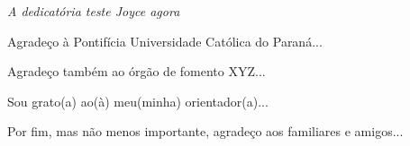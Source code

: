 

\imprimircapa

\imprimirfolhaderosto



\begin{fichacatalografica}
    
\end{fichacatalografica}






\begin{dedicatoria}
\vspace*{\fill}
\begin{flushright}
\begin{minipage}{8.5cm}
\raggedleft
\textit{
A dedicatória teste Joyce agora
}
\end{minipage}
\end{flushright}
\end{dedicatoria}



\begin{agradecimentos}


Agradeço à Pontifícia Universidade Católica do Paraná...

Agradeço também ao órgão de fomento XYZ...  

Sou grato(a) ao(à) meu(minha) orientador(a)... 

Por fim, mas não menos importante, agradeço aos familiares e amigos...

\end{agradecimentos}




